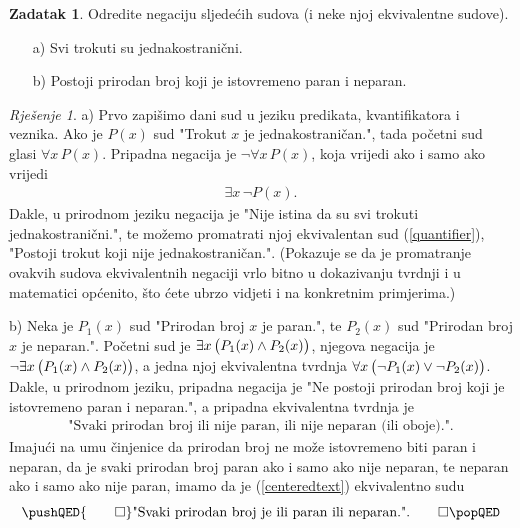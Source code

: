\documentclass{book}
\let\originalleft\left
\let\originalright\right
\renewcommand{\left}{\mathopen{}\mathclose\bgroup\originalleft}
\renewcommand{\right}{\aftergroup\egroup\originalright}
\theoremstyle{definition}
\theoremstyle{definition}
\newtheorem{exercise}{Zadatak}
\theoremstyle{remark}
\newtheorem*{proof*}{Rješenje}
\begin{document}
\begin{exercise}
Odredite negaciju sljedećih sudova (i neke njoj ekvivalentne sudove).
\begin{itemize}
\item[a)] Svi trokuti su jednakostranični.
\item[b)] Postoji prirodan broj koji je istovremeno paran i neparan.
\end{itemize}
\end{exercise}
\begin{proof*}
a) Prvo zapišimo dani sud u jeziku predikata, kvantifikatora i veznika. Ako je $P(x)$ sud "Trokut $x$ je jednakostraničan.", tada početni sud glasi $\forall{x}\, P(x)$. Pripadna negacija je $\neg \forall{x}\, P(x)$, koja vrijedi ako i samo ako vrijedi 
\begin{align}
\label{quantifier}
\exists{x}\,\neg P(x).
\end{align}
Dakle, u prirodnom jeziku negacija je "Nije istina da su svi trokuti jednakostranični.", te možemo promatrati njoj ekvivalentan sud (\ref{quantifier}), "Postoji trokut koji nije jednakostraničan.". (Pokazuje se da je promatranje ovakvih sudova ekvivalentnih negaciji vrlo bitno u dokazivanju tvrdnji i u matematici općenito, što ćete ubrzo vidjeti i na konkretnim primjerima.)

b) Neka je $P_1(x)$ sud "Prirodan broj $x$ je paran.", te $P_2(x)$ sud "Prirodan broj $x$ je neparan.". Početni sud je $\exists{x}\, \left(P_1(x)\wedge P_2(x)\right)$, njegova negacija je $\neg\exists{x}\, \left(P_1(x)\wedge P_2(x)\right)$, a jedna njoj ekvivalentna tvrdnja $\forall{x}\, \left(\neg P_1(x)\vee \neg P_2(x)\right)$. Dakle, u prirodnom jeziku, pripadna negacija je "Ne postoji prirodan broj koji je istovremeno paran i neparan.", a pripadna ekvivalentna tvrdnja je 
\begin{align}
\label{centeredtext}
\text{"Svaki prirodan broj ili nije paran, ili nije neparan (ili oboje).".}
\end{align}
Imajući na umu činjenice da prirodan broj ne može istovremeno biti paran i neparan, da je svaki prirodan broj paran ako i samo ako nije neparan, te neparan ako i samo ako nije paran, imamo da je (\ref{centeredtext}) ekvivalentno sudu 
\[
\pushQED{\qed}
\text{"Svaki prirodan broj je ili paran ili neparan.".}\qedhere
\popQED
\]
\end{proof*}
\end{document}

